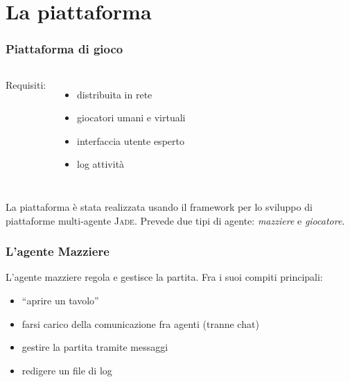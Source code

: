 \documentclass{beamer}
\newcommand*\lista{\item[$\diamondsuit$]}
\begin{document}
\section{La piattaforma}

\begin{frame}
   \frametitle{Piattaforma di gioco}
   \begin{columns}

   Requisiti:
   \begin{itemize}
      \lista distribuita in rete
      \lista giocatori umani e virtuali
      \lista interfaccia utente esperto
      \lista log attività
   \end{itemize}



   \begin{center}
   \begin{figure}      
   \end{figure}
   \end{center}

   \end{columns}
   
   \vfill
   \pause

   La piattaforma è stata realizzata usando il framework per lo sviluppo di piattaforme multi-agente \textsc{Jade}.
   \vfill
   Prevede due tipi di agente: \emph{mazziere} e \emph{giocatore}.
   \vfill

\end{frame}





\begin{frame}
   \frametitle{L'agente Mazziere}
   L'agente mazziere regola e gestisce la partita. Fra i suoi compiti principali:
   \begin{itemize}
      \pause
      \lista ``aprire un tavolo'' 
      \pause
      \lista farsi carico della comunicazione fra agenti (tranne chat)
      \pause
      \lista gestire la partita tramite messaggi
      \pause
      \lista redigere un file di log
    \end{itemize}
\end{frame}
\end{document}
